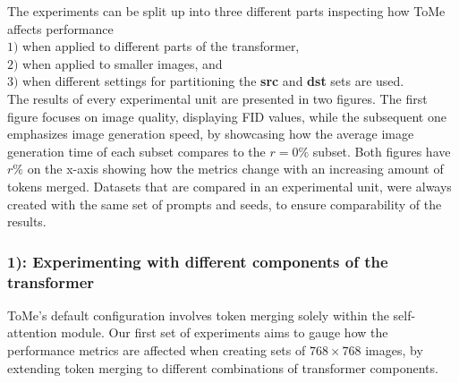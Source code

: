 The experiments can be split up into three different parts inspecting how ToMe affects performance\\ \(1)\) when applied to different parts of the transformer,\\ \(2)\) when applied to smaller images, and\\ \(3)\) when different settings for partitioning the \textbf{src} and \textbf{dst} sets are used.
\\
The results of every experimental unit are presented in two figures. The first figure focuses on image quality, displaying FID values, while the subsequent one emphasizes image generation speed, by showcasing how the average image generation time of each subset compares to the \(r=0\%\) subset.
Both figures have \(r\%\) on the x-axis showing how the metrics change with an increasing amount of tokens merged.
Datasets that are compared in an experimental unit, were always created with the same set of prompts and seeds, to ensure comparability of the results.



\subsubsection*{1): Experimenting with different components of the transformer}
ToMe's default configuration involves token merging solely within the self-attention module.
Our first set of experiments aims to gauge how the performance metrics are affected when creating sets of $768 \times 768$ images, by extending token merging to different combinations of transformer components.



